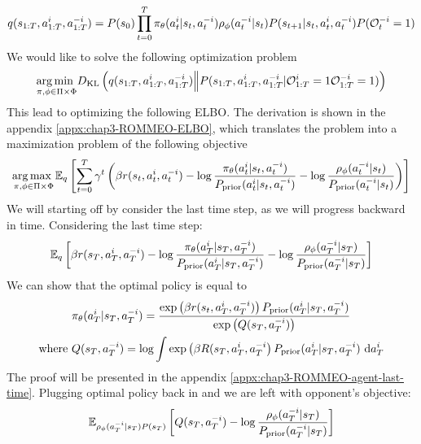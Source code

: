 \begin{equation}
    q(s_{1:T}, a_{1:T}^i, a^{-i}_{1:T}) = P(s_0) \prod^T_{t=0} \pi_{\theta}(a^i_t | s_t, a^{-i}_t) \rho_{\phi}(a^{-i}_t | s_t) P(s_{t+1} | s_t, a^i_t, a^{-i}_t)P(\mathcal{O}^{-i}_t = 1)
\end{equation}
We would like to solve the following optimization problem 
\begin{equation}
    \underset{\pi, \phi \in \Pi \times \Phi}{\arg\min \ }  D_{\mathrm{KL}}\left( q(s_{1:T}, a_{1:T}^i, a^{-i}_{1:T}) \Big\| P(s_{1:T}, a^i_{1:T}, a^{-i}_{1:T}|\mathcal{O}^i_{1:T} = 1  \mathcal{O}^{-i}_{1:T} = 1)  \right)
\end{equation}
This lead to optimizing the following ELBO. The derivation is shown in the appendix \ref{appx:chap3-ROMMEO-ELBO}, which translates the problem into a maximization problem of the following objective
\begin{equation}
\label{eqn:chap3-ROMMEO-ELBO}
    \underset{\pi, \phi \in \Pi \times \Phi}{\arg\max \ } \mathbb{E}_{q}\left[  \sum^T_{t=0} \gamma^t\left( \beta r(s_t, a^i_t, a^{-i}_t)  - \log \frac{\pi_{\theta}(a^i_t | s_t, a^{-i}_t)}{P_{\text{prior}}(a^i_t | s_t, a^{-i}_t) } - \log \frac{\rho_{\phi}(a^{-i}_t | s_t)}{P_{\text{prior}}(a^{-i}_t | s_t)} \right) \right]
\end{equation}
We will starting off by consider the last time step, as we will progress backward in time. Considering the last time step:
\begin{equation}
\label{eqn:training-obj-last-time}
    \mathbb{E}_{q} \left[  \beta r(s_T, a^i_T, a^{-i}_T)  - \log \frac{\pi_{\theta}(a^i_T | s_T, a^{-i}_T)}{P_{\text{prior}}(a^i_T | s_T, a^{-i}_T) } - \log \frac{\rho_{\phi}(a^{-i}_T | s_T)}{P_{\text{prior}}(a^{-i}_T | s_T)} \right]
\end{equation}
We can show that the optimal policy is equal to 
\begin{equation}
\begin{aligned}
    &\pi_{\theta}(a^i_T | s_T, a^{-i}_T) = \frac{\exp \left( \beta r(s_t, a^i_T, a^{-i}_T) \right)P_{\text{prior}}(a^i_T | s_T, a^{-i}_T)}{\exp\left( Q(s_T, a^{-i}_T) \right)} \\
    \text{where }& Q(s_T, a^{-i}_T) = \log \int \exp \left( \beta R(s_T, a^i_T, a^{-i}_T \right)P_{\text{prior}}(a^i_T | s_T, a^{-i}_T)  \ \mathrm{d} a^i_T
\end{aligned}
\end{equation}
The proof will be presented in the appendix \ref{appx:chap3-ROMMEO-agent-last-time}. Plugging optimal policy back in and we are left with opponent's objective:
\begin{equation}
    \mathbb{E}_{ \rho_{\phi}(a^{-i}_T | s_T) P(s_T)}\left[  Q(s_T, a^{-i}_T) - \log \frac{\rho_{\phi}(a^{-i}_T | s_T)}{P_{\text{prior}}(a^{-i}_T | s_T)}  \right]
\end{equation}
